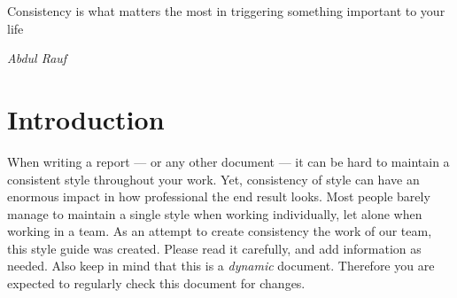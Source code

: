 \epigraph{Consistency is what matters the most in triggering something important to your life}{\textit{Abdul Rauf}}
\section{Introduction}
 
When writing a report --- or any other document --- it can be hard to maintain a consistent style throughout your work.
Yet, consistency of style can have an enormous impact in how professional the end result looks.
Most people barely manage to maintain a single style when working individually, let alone when working in a team.
As an attempt to create consistency the work of our team, this style guide was created.
Please read it carefully, and add information as needed.
Also keep in mind that this is a \emph{dynamic} document.
Therefore you are expected to regularly check this document for changes.